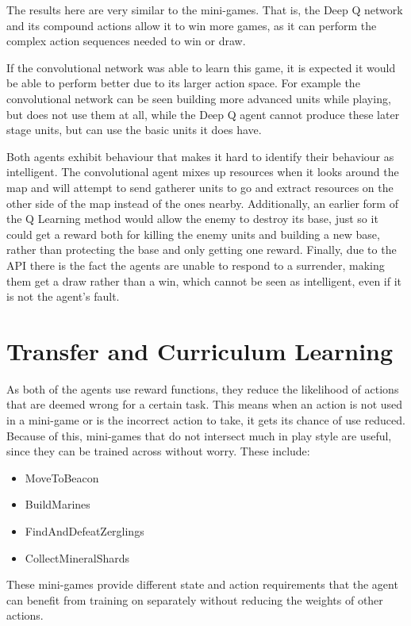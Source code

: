 The results here are very similar to the mini-games. That is, the Deep Q network
and its compound actions allow it to win more games, as it can perform
the complex action sequences needed to win or draw.

If the convolutional network was able to learn this game, it is expected it
would be able to perform better due to its larger action space. For example the
convolutional network can be seen building more advanced units while playing,
but does not use them at all, while the Deep Q agent cannot produce these
later stage units, but can use the basic units it does have.

Both agents exhibit behaviour that makes it hard to identify their behaviour as
intelligent. The convolutional agent mixes up resources when it looks around the
map and will attempt to send gatherer units to go and extract resources on the
other side of the map instead of the ones nearby. Additionally, an earlier form
of the Q Learning method would allow the enemy to destroy its base, just so it
could get a reward both for killing the enemy units and building a new base,
rather than protecting the base and only getting one reward. Finally, due to the
API there is the fact the agents are unable to respond to a surrender, making
them get a draw rather than a win, which cannot be seen as intelligent, even if
it is not the agent's fault.

\section{Transfer and Curriculum Learning}

As both of the agents use reward functions, they reduce the likelihood of
actions that are deemed wrong for a certain task. This means when an action is
not used in a mini-game or is the incorrect action to take, it gets its chance
of use reduced. Because of this, mini-games that do not intersect much in
play style are useful, since they can be trained across without worry. These
include:

\begin{itemize}
    \item MoveToBeacon
    \item BuildMarines
    \item FindAndDefeatZerglings
    \item CollectMineralShards
\end{itemize}

These mini-games provide different state and action requirements that the
agent can benefit from training on separately without reducing the weights of
other actions.

